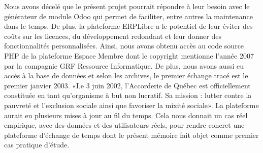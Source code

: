 




Nous avons décelé que le présent projet pourrait répondre à leur besoin avec le générateur de module Odoo qui permet de faciliter, entre autres la maintenance dans le temps. De plus, la plateforme ERPLibre a le potentiel de leur éviter des coûts sur les licences, du développement redondant et leur donner des fonctionnalités personnalisées. Ainsi, nous avons obtenu accès au code source PHP de la plateforme Espace Membre dont le copyright mentionne l’année 2007 par la compagnie GRF Ressource Informatique. De plus, nous avons aussi eu accès à la base de données et selon les archives, le premier échange tracé est le premier janvier 2003. «Le 3 juin 2002, l’Accorderie de Québec est officiellement constituée en tant qu’organisme à but non lucratif. Sa mission : lutter contre la pauvreté et l’exclusion sociale ainsi que favoriser la mixité sociale»\cite{erudit_accorderie_2014}. La plateforme aurait eu plusieurs mises à jour au fil du temps. Cela nous donnait un cas réel empirique, avec des données et des utilisateurs réels, pour rendre concret une plateforme d'échange de temps dont le présent mémoire fait objet comme premier cas pratique d'étude.

